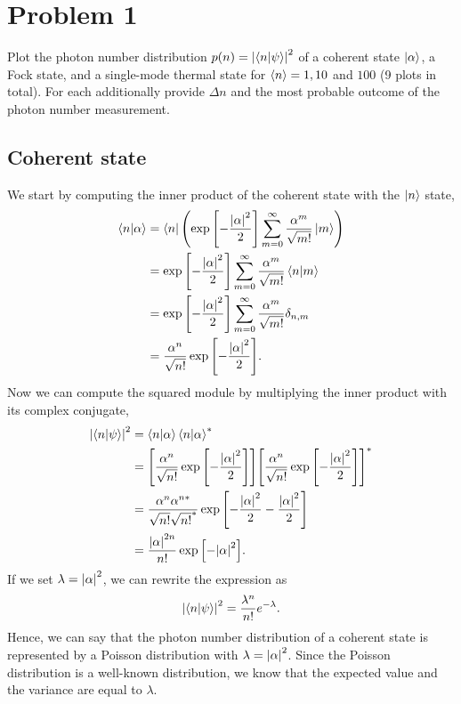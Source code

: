 \documentclass[../main.tex]{subfiles}
\begin{document}
\section{Problem 1}

Plot the photon number distribution $p(n)=\abs{\braket{n}{\psi}}^2$ of a coherent state $\ket{\alpha}$, a Fock state, and a single-mode thermal state for $\expval{n}=1,10$ and $100$ (9 plots in total).
For each additionally provide $\Delta n$ and the most probable outcome of the photon number measurement.

\subsection{Coherent state}

We start by computing the inner product of the coherent state with the $\ket{n}$ state,
\begin{align*}
    \braket{n}{\alpha} &= \bra{n}\qty(\exp\qty[-\frac{\abs{\alpha}^2}{2}]\sum_{m=0}^\infty\frac{\alpha^m}{\sqrt{m!}}\ket{m}) \\
    &= \exp\qty[-\frac{\abs{\alpha}^2}{2}]\sum_{m=0}^\infty\frac{\alpha^m}{\sqrt{m!}}\braket{n}{m} \\
    &= \exp\qty[-\frac{\abs{\alpha}^2}{2}]\sum_{m=0}^\infty\frac{\alpha^m}{\sqrt{m!}}\delta_{n,m} \\
    &= \frac{\alpha^n}{\sqrt{n!}}\exp\qty[-\frac{\abs{\alpha}^2}{2}].
\end{align*}
Now we can compute the squared module by multiplying the inner product with its complex conjugate,
\begin{align*}
    \abs{\braket{n}{\psi}}^2 &= \braket{n}{\alpha}\braket{n}{\alpha}^* \\
    &= \qty[\frac{\alpha^n}{\sqrt{n!}}\exp\qty[-\frac{\abs{\alpha}^2}{2}]]\qty[\frac{\alpha^n}{\sqrt{n!}}\exp\qty[-\frac{\abs{\alpha}^2}{2}]]^*\\
    &= \frac{\alpha^n\alpha^{n*}}{\sqrt{n!}\sqrt{n!}^*}
    \exp\qty[-\frac{\abs{\alpha}^2}{2}-\frac{\abs{\alpha}^2}{2}] \\
     &= \frac{\abs{\alpha}^{2n}}{n!}\exp\qty[-\abs{\alpha}^2].
\end{align*}
If we set $\lambda=\abs{\alpha}^2$, we can rewrite the expression as \[\abs{\braket{n}{\psi}}^2=\frac{\lambda^{n}}{n!}e^{-\lambda}.\]
Hence, we can say that the photon number distribution of a coherent state is represented by a Poisson distribution with $\lambda=\abs{\alpha}^2$.
Since the Poisson distribution is a well-known distribution, we know that the expected value and the variance are equal to $\lambda$.
\end{document}
